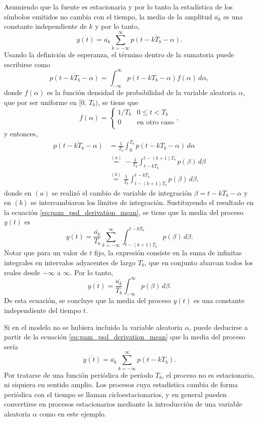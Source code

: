 \documentclass[a4paper]{article}
\begin{document}
Asumiendo que la fuente es estacionaria y por lo tanto la estadística de los símbolos emitidos no cambia con el tiempo, la media de la amplitud \(\overline{a_k}\) es una constante independiente de \(k\) y por lo tanto,
\begin{equation}\label{eq:pam_psd_derivation_mean}
 \overline{y(t)} = \overline{a_k}\sum_{k=-\infty}^{\infty}\overline{p(t-kT_b-\alpha)}.
\end{equation}
Usando la definición de esperanza, el término dentro de la sumatoria puede escribirse como
\[
 \overline{p(t-kT_b-\alpha)} = \int_{-\infty}^{\infty}p(t-kT_b-\alpha)f(\alpha)\,d\alpha,
\]
donde \(f(\alpha)\) es la función densidad de probabilidad de la variable aleatoria \(\alpha\), que por ser uniforme en \([0,\,T_b)\), se tiene que
\begin{equation}\label{eq:pam_psd_derivation_alpha_pdf}
 f(\alpha)=
  \left\{\begin{array}{ll}
  1/T_b & 0 \leq t < T_b\\
  0 & \textrm{en otro caso}\\ \end{array} \right.,
\end{equation}
y entonces,
\begin{align*}
 \overline{p(t-kT_b-\alpha)} &= \frac{1}{T_b}\int_{0}^{T_b}p(t-kT_b-\alpha)\,d\alpha\\
  &\overset{(a)}{=}-\frac{1}{T_b}\int_{t-kT_b}^{t-(k+1)T_b}p(\beta)\,d\beta\\
  &\overset{(b)}{=}\frac{1}{T_b}\int_{t-(k+1)T_b}^{t-kT_b}p(\beta)\,d\beta,
\end{align*}
donde en \((a)\) se realizó el cambio de variable de integración \(\beta=t-kT_b-\alpha\) y en \((b)\) se intercambiaron los límites de integración. Sustituyendo el resultado en la ecuación \ref{eq:pam_psd_derivation_mean}, se tiene que la media del proceso \(y(t)\) es
\[
 \overline{y(t)} = \frac{\overline{a_k}}{T_b}\sum_{k=-\infty}^{\infty}\int_{t-(k+1)T_b}^{t-kT_b}p(\beta)\,d\beta.
\]
Notar que para un valor de \(t\) fijo, la expresión consiste en la suma de infinitas integrales en intervalos adyacentes de largo \(T_b\), que en conjunto abarcan todos los reales desde \(-\infty\) a \(\infty\). Por lo tanto,
\[
 \overline{y(t)}=\frac{\overline{a_k}}{T_b}\int_{-\infty}^{\infty}p(\beta)\,d\beta.
\]
De esta ecuación, se concluye que la media del proceso \(y(t)\) es una constante independiente del tiempo \(t\).

Si en el modelo no se hubiera incluido la variable aleatoria \(\alpha\), puede deducirse a partir de la ecuación \ref{eq:pam_psd_derivation_mean} que la media del proceso sería
\[
 \overline{y(t)} = \overline{a_k}\sum_{k=-\infty}^{\infty}p(t-kT_b).
\]
Por tratarse de una función periódica de período \(T_b\), el proceso no es estacionario, ni siquiera en sentido amplio. Los procesos cuya estadística cambia de forma periódica con el tiempo se llaman cicloestacionarios, y en general pueden convertirse en procesos estacionarios mediante la introducción de una variable aleatoria \(\alpha\) como en este ejemplo.
\end{document}
